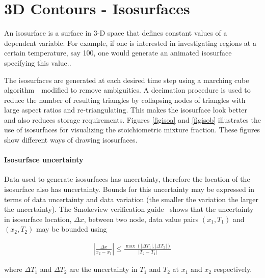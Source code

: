 \documentclass[11pt,twoside]{book}
\begin{document}
%
%

\clearpage
\section{3D Contours - Isosurfaces}
An isosurface is a surface in 3-D space that defines constant
values of a dependent variable. For example, if one is interested
in investigating regions at a certain temperature, say
\SI{100}{\degC}, one would generate an animated isosurface
specifying this value..

The isosurfaces are generated at each desired time step using a
marching cube algorithm~\cite{marchingcubes}\ modified to remove
ambiguities. A decimation procedure is used to reduce the number
of resulting triangles by collapsing nodes of triangles with large
aspect ratios and re-triangulating. This makes the isosurface look
better and also reduces storage requirements. Figures
\ref{figisoa} and \ref{figisob} illustrates the use of isosurfaces
for visualizing the stoichiometric mixture fraction. These figures
show different ways of drawing isosurfaces.

\paragraph{Isosurface uncertainty} Data used to generate isosurfaces
has uncertainty, therefore the location of the isosurface
also has uncertainty.  Bounds for this uncertainty may be expressed
in terms of data uncertainty and data variation (the smaller the
variation the larger the uncertainty).
The Smokeview verification guide~\cite{Smokeview_Verification_Guide}
shows that the uncertainty in isosurface location, $\Delta x$,
between two node, data value pairs $(x_1,T_1)$ and $(x_2,T_2)$  may be bounded using

\begin{eqnarray}
\left|\frac{\Delta x}{x_2-x_1}\right|\le \frac{\max(|\Delta
T_1|,|\Delta T_2|)}{|T_2-T_1|}
\end{eqnarray}

\noindent where $\Delta T_1$ and $\Delta T_2$ are the uncertainty
in $T_1$ and $T_2$ at $x_1$ and $x_2$ respectively.
\end{document}
